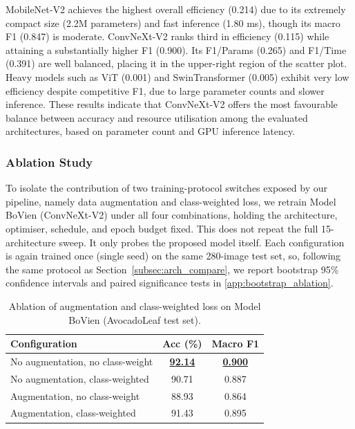 MobileNet-V2 achieves the highest overall efficiency (0.214) due to its extremely compact size (2.2M parameters) and fast inference (1.80 ms), though its macro F1 (0.847) is moderate. ConvNeXt-V2 ranks third in efficiency (0.115) while attaining a substantially higher F1 (0.900). Its F1/Params (0.265) and F1/Time (0.391) are well balanced, placing it in the upper-right region of the scatter plot. Heavy models such as ViT (0.001) and SwinTransformer (0.005) exhibit very low efficiency despite competitive F1, due to large parameter counts and slower inference. These results indicate that ConvNeXt-V2 offers the most favourable balance between accuracy and resource utilisation among the evaluated architectures, based on parameter count and GPU inference latency.

\subsubsection{Ablation Study}
\label{subsec:ablation}

To isolate the contribution of two training-protocol switches exposed by our pipeline, namely data augmentation and class-weighted loss, we retrain Model BoVien (ConvNeXt-V2) under all four combinations, holding the architecture, optimiser, schedule, and epoch budget fixed. This does not repeat the full 15-architecture sweep. It only probes the proposed model itself. Each configuration is again trained once (single seed) on the same 280-image test set, so, following the same protocol as Section~\ref{subsec:arch_compare}, we report bootstrap 95\% confidence intervals and paired significance tests in \ref{app:bootstrap_ablation}.

\begin{table}[htbp]
\centering
\caption{Ablation of augmentation and class-weighted loss on Model BoVien (AvocadoLeaf test set).}
\label{tab:ablation}
\small
\begin{tabularx}{\columnwidth}{X c c}
\toprule
\textbf{Configuration} & \textbf{Acc (\%)} & \textbf{Macro F1} \\
\midrule
No augmentation, no class-weight   & \textbf{\underline{92.14}} & \textbf{\underline{0.900}} \\
No augmentation, class-weighted    & 90.71 & 0.887 \\
Augmentation, no class-weight      & 88.93 & 0.864 \\
Augmentation, class-weighted       & 91.43 & 0.895 \\
\bottomrule
\end{tabularx}
\end{table}

